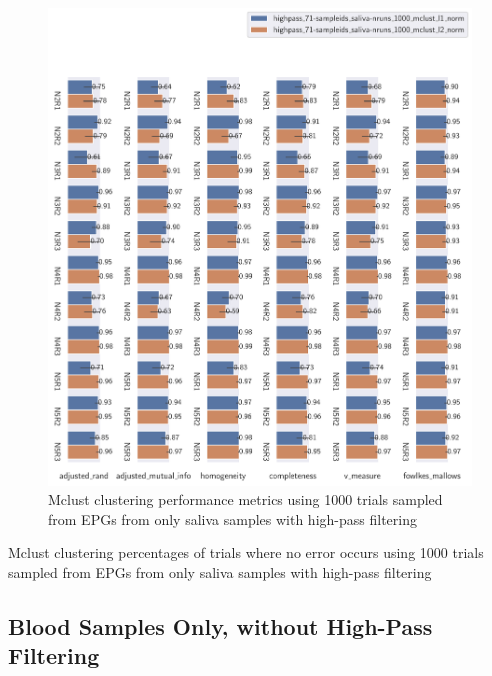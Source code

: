 \begin{theappendices}
\begin{figure}[htbp]
\centering
\includegraphics[width=\textwidth]{./figures/clust_comparison/highpass_71-sampleids_saliva-nruns_1000_mclust.pdf}
\caption{Mclust clustering performance metrics using 1000 trials sampled from EPGs from only saliva samples with high-pass filtering}
\label{appendix:fig:highpass_71-sampleids_saliva-nruns_1000_mclust}
\end{figure}

\begin{table}[htbp]
\centering
{}
\caption{Mclust clustering percentages of trials where no error occurs using 1000 trials sampled from EPGs from only saliva samples with high-pass filtering}
\label{appendix:table:highpass_71-sampleids_saliva-nruns_1000_mclust}
\end{table}

\FloatBarrier
\subsection{Blood Samples Only, without High-Pass Filtering}


\end{theappendices}

